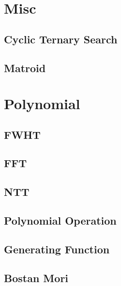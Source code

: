 \documentclass{article}
\begin{document}
\section{Misc}

%

\subsection{Cyclic Ternary Search}


\subsection{Matroid}


\section{Polynomial}

\subsection{FWHT}


\subsection{FFT}


\subsection{NTT}


\subsection{Polynomial Operation}


\subsection{Generating Function}


\subsection{Bostan Mori}

\end{document}
